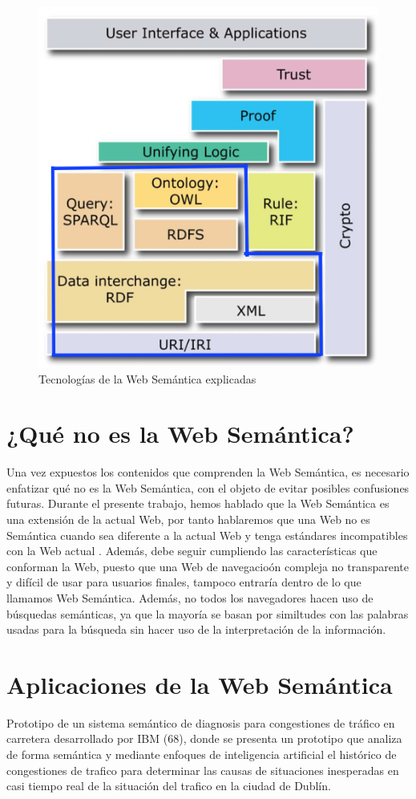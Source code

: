 \begin{figure}[H]
	\centering
	\includegraphics[width=0.6\linewidth]{imagenes/capitulo3/arquitectura2copia}
	\caption{Tecnologías de la Web Semántica explicadas}
	\label{fig:arquitectura2copia}
\end{figure}

\section{¿Qué no es la Web Semántica?}

Una vez expuestos los contenidos que comprenden la Web Semántica, es necesario enfatizar qué no es la Web Semántica, con el objeto de evitar posibles confusiones futuras. Durante el presente trabajo, hemos hablado que la Web Semántica es una extensión de la actual Web, por tanto hablaremos que una Web no es Semántica cuando sea diferente a la actual Web y tenga estándares incompatibles con la Web actual \cite{introduccion}. Además, debe seguir cumpliendo las características que conforman la Web, puesto que una Web de navegacioón compleja no transparente y difícil de usar para usuarios finales, tampoco entraría dentro de lo que llamamos Web Semántica. Además, no todos los navegadores hacen uso de búsquedas semánticas, ya que la mayoría se basan por similtudes con las palabras usadas para la búsqueda sin hacer uso de la interpretación de la información.

\section{Aplicaciones de la Web Semántica}


Prototipo de un sistema semántico de diagnosis para congestiones de tráfico en carretera desarrollado por IBM (68), donde se presenta un prototipo que analiza de forma semántica y mediante enfoques de inteligencia artificial el histórico de congestiones de trafico para determinar las causas de situaciones inesperadas en casi tiempo real de la situación del trafico en la ciudad de Dublín.


